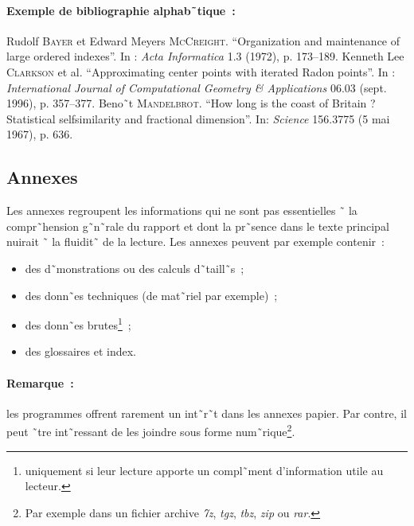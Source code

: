 \paragraph{Exemple de bibliographie alphab˜tique~:}
\begingroup
\renewcommand{\section}[2]{}%
\begin{thebibliography}{WWW99}
 Rudolf \textsc{Bayer} et Edward Meyers \textsc{McCreight}. ``Organization and
  maintenance of large ordered indexes''. In : \emph{Acta Informatica} 1.3
  (1972), p. 173--189.
 Kenneth Lee \textsc{Clarkson} et al. ``Approximating center points with
  iterated Radon points''. In : \emph{International Journal of
    Computational Geometry \& Applications} 06.03 (sept. 1996), p. 357--377.
 Beno˜t \textsc{Mandelbrot}. ``How long is the coast of Britain ?
  Statistical selfsimilarity and fractional dimension''. In: \emph{Science}
  156.3775 (5 mai 1967), p. 636.
\end{thebibliography}
\endgroup

\subsection{Annexes}

Les annexes regroupent les informations qui ne sont pas essentielles ˜ la
compr˜hension g˜n˜rale du rapport et dont la pr˜sence dans le texte principal
nuirait ˜ la fluidit˜ de la lecture. Les annexes peuvent par exemple
contenir~:
\begin{itemize}
\item des d˜monstrations ou des calculs d˜taill˜s~;
\item des donn˜es techniques (de mat˜riel par exemple)~;
\item des donn˜es brutes\footnote{uniquement si leur lecture apporte un
    compl˜ment d'information utile au lecteur.}~;
\item des glossaires et index.
\end{itemize}

\paragraph{Remarque~:} les programmes offrent rarement un int˜r˜t dans les
annexes papier. Par contre, il peut ˜tre int˜ressant de les joindre sous forme
num˜rique\footnote{Par exemple dans un fichier archive \emph{7z}, \emph{tgz},
  \emph{tbz}, \emph{zip} ou \emph{rar}.}.

